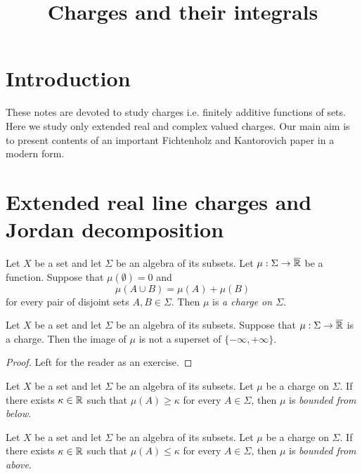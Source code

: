



\title{Charges and their integrals}
\date{}
\maketitle

\section{Introduction}
\noindent
These notes are devoted to study charges i.e. finitely additive functions of sets. Here we study only extended real and complex valued charges. Our main aim is to present contents of an important Fichtenholz and Kantorovich paper \cite{fichtenholz1934operations} in a modern form.

\section{Extended real line charges and Jordan decomposition}

\begin{definition}
    Let $X$ be a set and let $\Sigma$ be an algebra of its subsets. Let $\mu:\Sigma \rightarrow \overline{{\mathbb R}}$ be a function. Suppose that $\mu(\emptyset) = 0$ and
    $$\mu(A \cup B) = \mu(A) + \mu(B)$$
    for every pair of disjoint sets $A,B \in \Sigma$. Then $\mu$ is \textit{a charge on $\Sigma$}.
\end{definition}

\begin{fact}\label{fact:one_side_infinity_only_for_finitely_additive}
    Let $X$ be a set and let $\Sigma$ be an algebra of its subsets. Suppose that $\mu:\Sigma \rightarrow \overline{{\mathbb R}}$ is a charge. Then the image of $\mu$ is not a superset of $\{-\infty,+\infty\}$.
\end{fact}
\begin{proof}
    Left for the reader as an exercise.
\end{proof}

\begin{definition}
    Let $X$ be a set and let $\Sigma$ be an algebra of its subsets. Let $\mu$ be a charge on $\Sigma$. If there exists $\kappa \in {\mathbb R}$ such that $\mu(A) \geq
        \kappa$ for every $A \in \Sigma$, then $\mu$ is \textit{bounded from below}.
\end{definition}

\begin{definition}
    Let $X$ be a set and let $\Sigma$ be an algebra of its subsets. Let $\mu$ be a charge on $\Sigma$. If there exists $\kappa \in {\mathbb R}$ such that $\mu(A) \leq
        \kappa$ for every $A \in \Sigma$, then $\mu$ is \textit{bounded from above}.
\end{definition}

